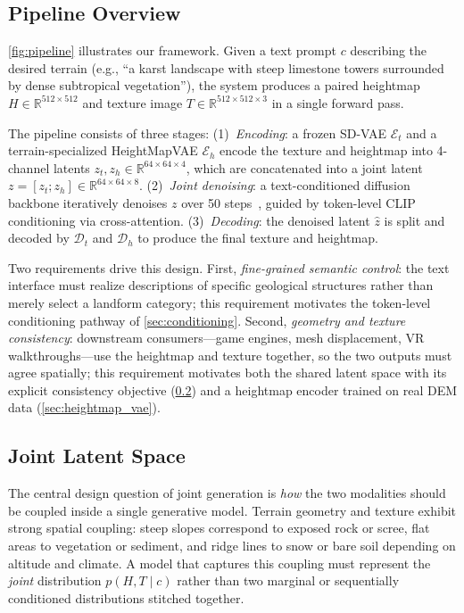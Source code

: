 \documentclass[review]{vgtc}                 %
\begin{document}
\subsection{Pipeline Overview}

\cref{fig:pipeline} illustrates our framework.
Given a text prompt $c$ describing the desired terrain (e.g., ``a karst landscape with steep limestone towers surrounded by dense subtropical vegetation''), the system produces a paired heightmap $H \in \mathbb{R}^{512 \times 512}$ and texture image $T \in \mathbb{R}^{512 \times 512 \times 3}$ in a single forward pass.

The pipeline consists of three stages:
(1)~\emph{Encoding}: a frozen SD-VAE $\mathcal{E}_t$ and a terrain-specialized HeightMapVAE $\mathcal{E}_h$ encode the texture and heightmap into 4-channel latents $z_t, z_h \in \mathbb{R}^{64 \times 64 \times 4}$, which are concatenated into a joint latent $z = [z_t; z_h] \in \mathbb{R}^{64 \times 64 \times 8}$.
(2)~\emph{Joint denoising}: a text-conditioned diffusion backbone iteratively denoises $z$ over 50 steps~\cite{DDIM:2022}, guided by token-level CLIP conditioning via cross-attention.
(3)~\emph{Decoding}: the denoised latent $\hat{z}$ is split and decoded by $\mathcal{D}_t$ and $\mathcal{D}_h$ to produce the final texture and heightmap.

Two requirements drive this design.
First, \emph{fine-grained semantic control}: the text interface must realize descriptions of specific geological structures rather than merely select a landform category; this requirement motivates the token-level conditioning pathway of \cref{sec:conditioning}.
Second, \emph{geometry and texture consistency}: downstream consumers---game engines, mesh displacement, VR walkthroughs---use the heightmap and texture together, so the two outputs must agree spatially; this requirement motivates both the shared latent space with its explicit consistency objective (\cref{sec:joint_latent}) and a heightmap encoder trained on real DEM data (\cref{sec:heightmap_vae}).


\subsection{Joint Latent Space}
\label{sec:joint_latent}

The central design question of joint generation is \emph{how} the two modalities should be coupled inside a single generative model.
Terrain geometry and texture exhibit strong spatial coupling: steep slopes correspond to exposed rock or scree, flat areas to vegetation or sediment, and ridge lines to snow or bare soil depending on altitude and climate.
A model that captures this coupling must represent the \emph{joint} distribution $p(H, T \mid c)$ rather than two marginal or sequentially conditioned distributions stitched together.
\end{document}
